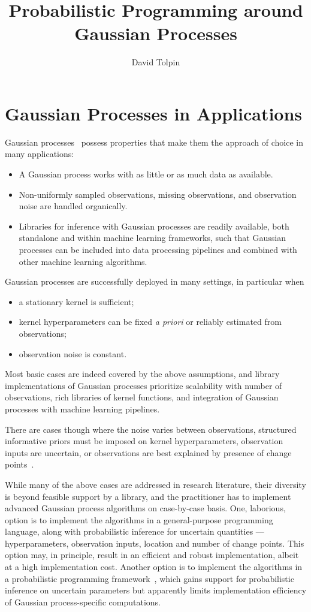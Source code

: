 \documentclass[sigplan,review]{acmart}\settopmatter{printfolios=true,printccs=false,printacmref=false}
\title{Probabilistic Programming around Gaussian Processes}
\author{David Tolpin}
\affiliation{
    \institution{PUB+}
    \country{Israel}
}
\begin{document}
\maketitle

\section{Gaussian Processes in Applications}

Gaussian processes~\cite{} possess properties that make
them the approach of choice in many applications:
\begin{itemize}
	\item A Gaussian process works with as little or as much
		data as available.
	\item Non-uniformly sampled observations, missing
		observations, and observation noise are handled
		organically.
	\item Libraries for inference with Gaussian processes
		are readily available, both standalone and within
		machine learning frameworks, such that Gaussian
		processes can be included into data processing
		pipelines and combined with other machine learning
		algorithms.
\end{itemize}

Gaussian processes are successfully deployed in many settings,
in particular when 
\begin{itemize}
    \item a stationary kernel is sufficient;
	\item kernel hyperparameters can be fixed \textit{a priori} or
		reliably estimated from observations;
	\item observation noise is constant.
\end{itemize}
Most basic cases are indeed covered by the above assumptions,
and library implementations of Gaussian processes prioritize
scalability with number of observations, rich libraries
of kernel functions, and integration of Gaussian processes with
machine learning pipelines.

There are cases though where the noise varies between
observations, structured informative priors must be imposed on
kernel hyperparameters, observation inputs are uncertain, or
observations are best explained by presence of change
points~\cite{}.

While many of the above cases are addressed in research
literature, their diversity is beyond feasible support by a
library, and the practitioner has to implement advanced Gaussian
process algorithms on case-by-case basis. One, laborious, option
is to implement the algorithms in a general-purpose programming
language, along with probabilistic inference for uncertain
quantities --- hyperparameters, observation inputs, location and
number of change points.  This option may, in principle, result
in an efficient and robust implementation, albeit at a high
implementation cost. Another option is to implement the
algorithms in a probabilistic programming framework~\cite{},
which gains support for probabilistic inference on uncertain
parameters but apparently limits implementation efficiency of
Gaussian process-specific computations.
\end{document}
